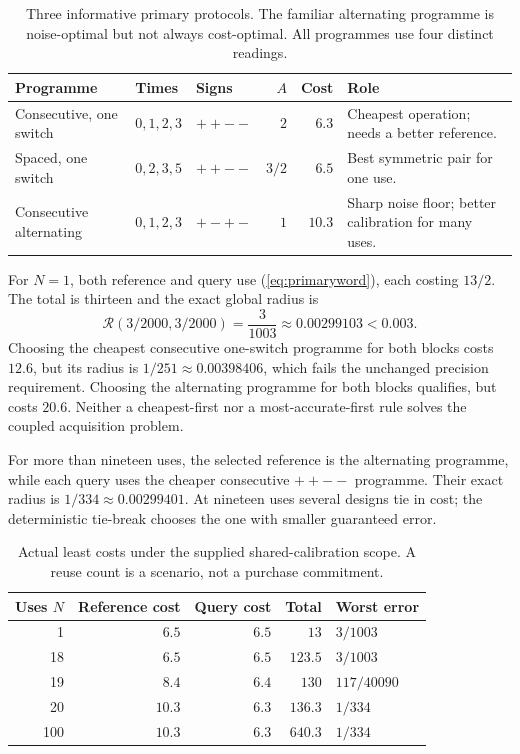 \documentclass[11pt,letterpaper]{article}
\theoremstyle{definition}\newtheorem{definition}[theorem]{Definition}
\theoremstyle{remark}\newtheorem{remark}[theorem]{Remark}
\begin{document}
\begin{table}[htbp]\centering\small
\caption{Three informative primary protocols. The familiar alternating programme is noise-optimal but not always cost-optimal. All programmes use four distinct readings.}
\begin{tabularx}{\linewidth}{@{}P{.23\linewidth}P{.18\linewidth}P{.16\linewidth}rrY@{}}\toprule
Programme & Times & Signs & $A$ & Cost & Role\\\midrule
Consecutive, one switch & $0,1,2,3$ & $++--$ & $2$ & $6.3$ & Cheapest operation; needs a better reference.\\
Spaced, one switch & $0,2,3,5$ & $++--$ & $3/2$ & $6.5$ & Best symmetric pair for one use.\\
Consecutive alternating & $0,1,2,3$ & $+-+-$ & $1$ & $10.3$ & Sharp noise floor; better calibration for many uses.\\\bottomrule
\end{tabularx}
\label{tab:protocols}
\end{table}

For $N=1$, both reference and query use (\ref{eq:primaryword}), each costing $13/2$. The total is thirteen and the exact global radius is
\begin{equation}
 \mathcal R(3/2000,3/2000)=\frac3{1003}\approx0.00299103<0.003.
 \label{eq:primaryrisk}
\end{equation}
Choosing the cheapest consecutive one-switch programme for both blocks costs $12.6$, but its radius is $1/251\approx0.00398406$, which fails the unchanged precision requirement. Choosing the alternating programme for both blocks qualifies, but costs $20.6$. Neither a cheapest-first nor a most-accurate-first rule solves the coupled acquisition problem.

For more than nineteen uses, the selected reference is the alternating programme, while each query uses the cheaper consecutive $++--$ programme. Their exact radius is $1/334\approx0.00299401$. At nineteen uses several designs tie in cost; the deterministic tie-break chooses the one with smaller guaranteed error.

\begin{table}[htbp]\centering\small
\caption{Actual least costs under the supplied shared-calibration scope. A reuse count is a scenario, not a purchase commitment.}
\begin{tabular}{@{}rrrrl@{}}\toprule
Uses $N$ & Reference cost & Query cost & Total & Worst error\\\midrule
1 & $6.5$ & $6.5$ & $13$ & $3/1003$\\
18 & $6.5$ & $6.5$ & $123.5$ & $3/1003$\\
19 & $8.4$ & $6.4$ & $130$ & $117/40090$\\
20 & $10.3$ & $6.3$ & $136.3$ & $1/334$\\
100 & $10.3$ & $6.3$ & $640.3$ & $1/334$\\\bottomrule
\end{tabular}
\label{tab:horizon}
\end{table}
\end{document}
